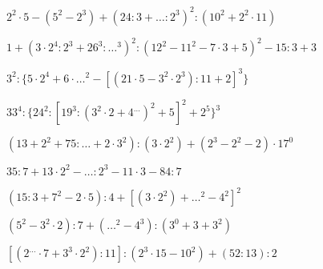 \begin{esercizio} %
\(2^2\cdot5-(5^2-2^3)+(24:3+{\dots}:2^3)^2:(10^2+2^2\cdot11)\) 
\end{esercizio}
\begin{esercizio} %
\(1+(3\cdot2^4:2^3+26^3:{\dots}^3)^2:(12^2-11^2-7\cdot3+5)^2-15:3+3\) 
\end{esercizio}
\begin{esercizio} %
\(3^2:\{5\cdot2^4+6\cdot{\dots}^2-[(21\cdot5-3^2\cdot2^3):11+2]^3\}\) 
\end{esercizio}
\begin{esercizio} %
\(33^4:\{24^2:[19^3:(3^2\cdot2+4^{\dots})^2+5]^2+2^{5}\}^3\) 
\end{esercizio}
\begin{esercizio} %
\((13+2^2+75:{\dots}+2\cdot3^2):(3\cdot2^2)+(2^3-2^2-2)\cdot17^0\) 
\end{esercizio}
\begin{esercizio} %
\(35:7+13\cdot2^2-{\dots}:2^3-11\cdot3-84:7\) 
\end{esercizio}
\begin{esercizio} %
\((15:3+7^2-2\cdot5):4+[(3\cdot2^2)+{\dots}^2-4^2]^2\) 
\end{esercizio}
\begin{esercizio} %
\((5^2-3^2\cdot2):7+({\dots}^2-4^3):(3^0+3+3^2)\) 
\end{esercizio}
\begin{esercizio} %
\([(2^{\dots}\cdot7+3^3\cdot2^2):11]:(2^3\cdot15-10^2)+(52:13):2\) 
\end{esercizio}
